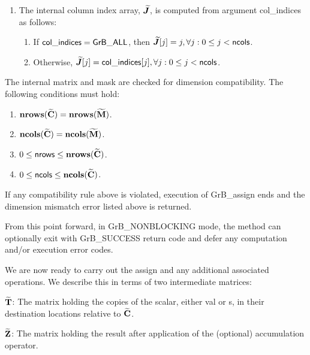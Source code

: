 \begin{enumerate}
    \item The internal column index array, $\bm{\widetilde{J}}$, is computed from 
    argument {\sf col\_indices} as follows:
	\begin{enumerate}
		\item	If ${\sf col\_indices} = {\sf GrB\_ALL}$, then 
        $\bm{\widetilde{J}}[j] = j, \forall j : 0 \leq j < {\sf ncols}$.

		\item	Otherwise, $\bm{\widetilde{J}}[j] = {\sf col\_indices}[j], 
        \forall j : 0 \leq j < {\sf ncols}$.
    \end{enumerate}
\end{enumerate}

The internal matrix and mask are checked for dimension compatibility. The following
conditions must hold:
\begin{enumerate}
    \item $\bold{nrows}({\bf \widetilde{C}}) = \bold{nrows}({\bf \widetilde{M}})$.

    \item $\bold{ncols}({\bf \widetilde{C}}) = \bold{ncols}({\bf \widetilde{M}})$.

    \item $0 \leq {\sf nrows} \leq \bold{nrows}({\bf \widetilde{C}})$.

    \item $0 \leq {\sf ncols} \leq \bold{ncols}({\bf \widetilde{C}})$.
\end{enumerate}
If any compatibility rule above is violated, execution of {\sf GrB\_assign} ends and 
the dimension mismatch error listed above is returned.

From this point forward, in {\sf GrB\_NONBLOCKING} mode, the method can 
optionally exit with {\sf GrB\_SUCCESS} return code and defer any computation 
and/or execution error codes.

We are now ready to carry out the assign and any additional 
associated operations.  We describe this in terms of two intermediate matrices:
\begin{itemize}
{\color{red}
    \item ${\bf \widetilde{T}}$: The matrix holding the copies of the scalar, either 
	{\sf val} or {\sf s}, in their destination locations relative to 
    ${\bf \widetilde{C}}$.
}

    \item ${\bf \widetilde{Z}}$: The matrix holding the result after 
    application of the (optional) accumulation operator.
\end{itemize}

